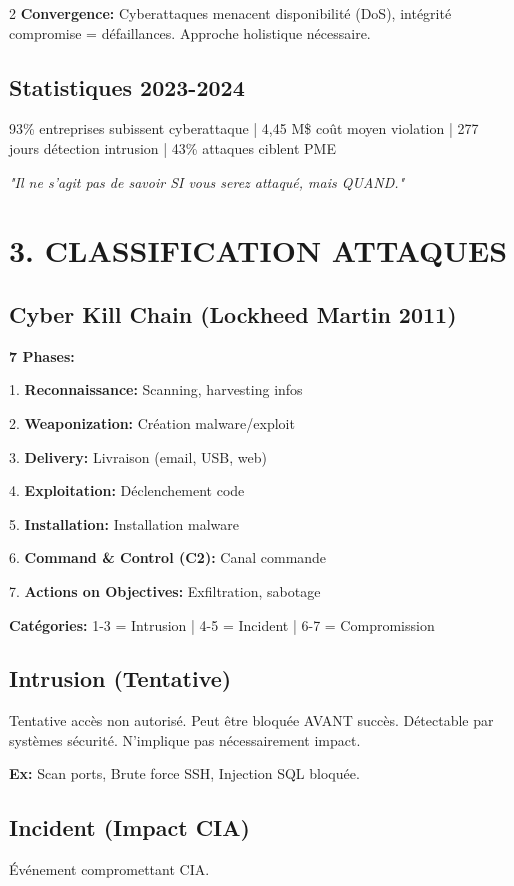 \documentclass[9pt,a4paper]{extarticle}
\begin{document}
\begin{multicols}{2}
\textbf{Convergence:} Cyberattaques menacent disponibilité (DoS), intégrité compromise = défaillances. Approche holistique nécessaire.

\subsection*{Statistiques 2023-2024}
93\% entreprises subissent cyberattaque | 4,45 M\$ coût moyen violation | 277 jours détection intrusion | 43\% attaques ciblent PME

\textit{"Il ne s'agit pas de savoir SI vous serez attaqué, mais QUAND."}

\section*{3. CLASSIFICATION ATTAQUES}

\subsection*{Cyber Kill Chain (Lockheed Martin 2011)}
\textbf{7 Phases:}

1. \textbf{Reconnaissance:} Scanning, harvesting infos

2. \textbf{Weaponization:} Création malware/exploit

3. \textbf{Delivery:} Livraison (email, USB, web)

4. \textbf{Exploitation:} Déclenchement code

5. \textbf{Installation:} Installation malware

6. \textbf{Command \& Control (C2):} Canal commande

7. \textbf{Actions on Objectives:} Exfiltration, sabotage

\textbf{Catégories:} 1-3 = Intrusion | 4-5 = Incident | 6-7 = Compromission

\subsection*{Intrusion (Tentative)}
Tentative accès non autorisé. Peut être bloquée AVANT succès. Détectable par systèmes sécurité. N'implique pas nécessairement impact.

\textbf{Ex:} Scan ports, Brute force SSH, Injection SQL bloquée.

\subsection*{Incident (Impact CIA)}
Événement compromettant CIA.


\end{multicols}
\end{document}

